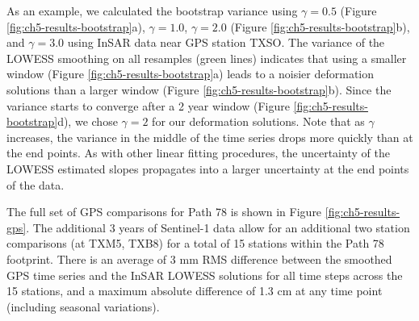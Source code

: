 As an example, we calculated the bootstrap variance using $ \gamma = 0.5 $ (Figure \ref{fig:ch5-results-bootstrap}a), $ \gamma = 1.0 $, $ \gamma = 2.0 $ (Figure \ref{fig:ch5-results-bootstrap}b), and $ \gamma = 3.0 $ using InSAR data near GPS station TXSO.
The variance of the LOWESS smoothing on all resamples (green lines) indicates that using a smaller window (Figure \ref{fig:ch5-results-bootstrap}a) leads to a noisier deformation solutions than a larger window (Figure \ref{fig:ch5-results-bootstrap}b). 
Since the variance starts to converge after a 2 year window (Figure \ref{fig:ch5-results-bootstrap}d), we chose $ \gamma = 2 $ for our deformation solutions. Note that as $ \gamma $ increases, the variance in the middle of the time series drops more quickly than at the end points. As with other linear fitting procedures, the uncertainty of the LOWESS estimated slopes propagates into a larger uncertainty at the end points of the data.


The full set of GPS comparisons for Path 78 is shown in Figure \ref{fig:ch5-results-gps}. 
The additional 3 years of Sentinel-1 data allow for an additional two station comparisons (at TXM5, TXB8) for a total of 15 stations within the Path 78 footprint.
There is an average of 3 mm RMS difference between the smoothed GPS time series and the InSAR LOWESS solutions for all time steps across the 15 stations, and a maximum absolute difference of 1.3 cm at any time point (including seasonal variations).


